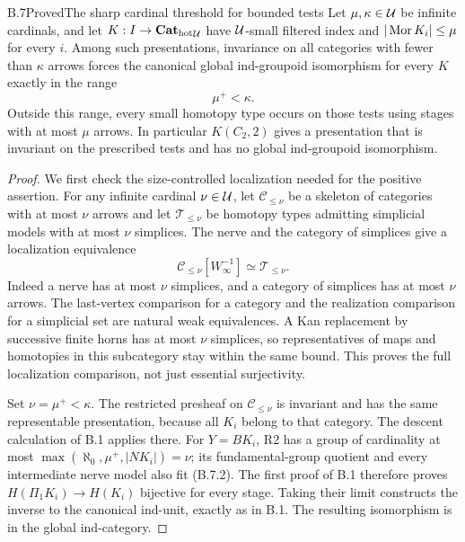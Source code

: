 \begin{claim}{B.7}{Proved}{The sharp cardinal threshold for bounded tests}
Let $\mu,\kappa\in\mathcal U$ be infinite cardinals, and let $K:I\to{\mathbf{Cat}_{\mathrm{hot}}}_\mathcal U$ have $\mathcal U$-small filtered index and $|\operatorname{Mor} K_i|\leq\mu$ for every $i$. Among such presentations, invariance on all categories with fewer than $\kappa$ arrows forces the canonical global ind-groupoid isomorphism for every $K$ exactly in the range
\[
                         \mu^+<\kappa. \tag{B.7.1}
\]
Outside this range, every small homotopy type occurs on those tests using stages with at most $\mu$ arrows. In particular $K(C_2,2)$ gives a presentation that is invariant on the prescribed tests and has no global ind-groupoid isomorphism.
\end{claim}
\begin{proof}
We first check the size-controlled localization needed for the positive assertion. For any infinite cardinal $\nu\in\mathcal U$, let $\mathcal C_{\leq\nu}$ be a skeleton of categories with at most $\nu$ arrows and let $\mathcal T_{\leq\nu}$ be homotopy types admitting simplicial models with at most $\nu$ simplices. The nerve and the category of simplices give a localization equivalence
\[
 \mathcal C_{\leq\nu}[W_\infty^{-1}]
       \simeq\mathcal T_{\leq\nu}. \tag{B.7.2}
\]
Indeed a nerve has at most $\nu$ simplices, and a category of simplices has at most $\nu$ arrows. The last-vertex comparison for a category and the realization comparison for a simplicial set are natural weak equivalences. A Kan replacement by successive finite horns has at most $\nu$ simplices, so representatives of maps and homotopies in this subcategory stay within the same bound. This proves the full localization comparison, not just essential surjectivity.

Set $\nu=\mu^+<\kappa$. The restricted presheaf on $\mathcal C_{\leq\nu}$ is invariant and has the same representable presentation, because all $K_i$ belong to that category. The descent calculation of B.1 applies there. For $Y=BK_i$, R2 has a group of cardinality at most $\max(\aleph_0,\mu^+,|NK_i|)=\nu$; its fundamental-group quotient and every intermediate nerve model also fit (B.7.2). The first proof of B.1 therefore proves $H(\Pi_1K_i)\to H(K_i)$ bijective for every stage. Taking their limit constructs the inverse to the canonical ind-unit, exactly as in B.1. The resulting isomorphism is in the global ind-category.


\end{proof}
